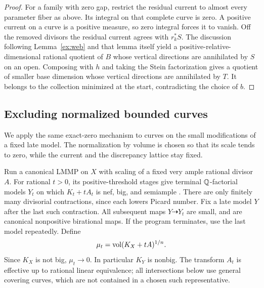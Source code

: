 \begin{proof}
For a family with zero gap, restrict the residual current to
almost every parameter fiber as above. Its integral on that
complete curve is zero. A positive current on a curve is a
positive measure, so zero integral forces it to vanish.
Off the removed divisors the residual current agrees with
\(r_k^*S\).
The discussion following Lemma~\ref{ex:web} and that lemma
itself yield a positive-relative-dimensional rational
quotient of \(B\) whose vertical directions are annihilated
by \(S\) on an open. Composing with \(h\) and taking the
Stein factorization gives a quotient of smaller base dimension
whose vertical directions are annihilated by \(T\). It belongs
to the collection minimized at the start, contradicting the
choice of \(b\).
\end{proof}

\subsection{Excluding normalized bounded curves}

We apply the same exact-zero mechanism to curves on the small
modifications of a fixed late model. The normalization by volume is
chosen so that its scale tends to zero, while the current and the
discrepancy lattice stay fixed.

Run a canonical LMMP on \(X\) with scaling of a fixed very ample
rational divisor \(A\). For rational \(t>0\), its positive-threshold
stages give terminal \(\mathbb{Q}\)-factorial models \(Y_t\) on which
\(K_t+tA_t\) is nef, big, and semiample
\cite{BCHM2010}. There are only finitely many divisorial
contractions, since each lowers Picard number. Fix a late model
\(Y\) after the last such contraction. All subsequent maps
\(Y\dashrightarrow Y_t\) are small, and are canonical
nonpositive birational maps. If the program terminates, use
the last model repeatedly. Define
\begin{equation}\label{ex:volume-scale}
 \mu_t=\operatorname{vol}(K_X+tA)^{1/n}.
\end{equation}
Since \(K_X\) is not big, \(\mu_t\to0\). In particular \(K_Y\)
is nonbig. The transform \(A_t\) is effective up to rational
linear equivalence; all intersections below use general
covering curves, which are not contained in a chosen such
representative.

